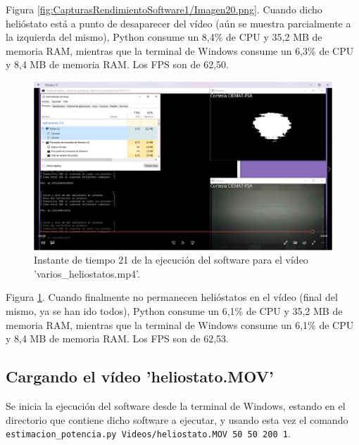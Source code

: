 Figura \ref{fig:CapturasRendimientoSoftware1/Imagen20.png}. Cuando dicho helióstato está a punto de desaparecer del vídeo (aún se muestra parcialmente a la izquierda del mismo), Python consume un 8,4\% de CPU y 35,2 MB de memoria RAM, mientras que la terminal de Windows consume un 6,3\% de CPU y 8,4 MB de memoria RAM. Los FPS son de 62,50.

\begin{figure}[h!]
  	\centering
	\includegraphics[width=\textwidth]{CapturasRendimientoSoftware1/Imagen21.png}
	\caption{Instante de tiempo 21 de la ejecución del software para el vídeo 'varios\_heliostatos.mp4'.
	\label{fig:CapturasRendimientoSoftware1/Imagen21.png}}
\end{figure}

Figura \ref{fig:CapturasRendimientoSoftware1/Imagen21.png}. Cuando finalmente no permanecen helióstatos en el vídeo (final del mismo, ya se han ido todos), Python consume un 6,1\% de CPU y 35,2 MB de memoria RAM, mientras que la terminal de Windows consume un 6,1\% de CPU y 8,4 MB de memoria RAM. Los FPS son de 62,53.

\subsection{Cargando el vídeo 'heliostato.MOV'}

Se inicia la ejecución del software desde la terminal de Windows, estando en el directorio que contiene dicho software a ejecutar, y usando esta vez el comando\\ \verb|estimacion_potencia.py Videos/heliostato.MOV 50 50 200 1|.

